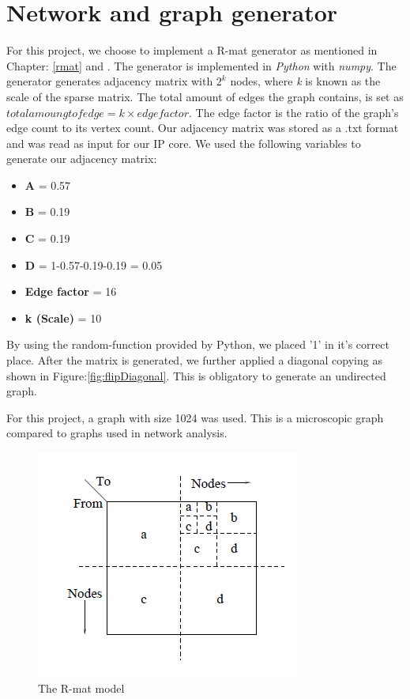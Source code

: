 \section{Network and graph generator}
For this project, we choose to implement a R-mat generator as mentioned in Chapter: \ref{rmat} and  \cite{Rmat2004}. The generator is implemented in \textit{Python} \cite{PYTHON} with \textit{numpy}. The generator generates adjacency matrix with $2^k$ nodes, where \textit{k} is known as the scale of the sparse matrix. The total amount of edges the graph contains, is set as $total amoungt of edge = k \times edge factor $. The edge factor is the ratio of the graph's edge count to its vertex count\cite{graph500}. Our adjacency matrix was stored as a .txt format and was read as input for our IP core. 
We used the following variables to generate our adjacency matrix:
\begin{itemize}
\item \textbf{A} = 0.57
\item \textbf{B} = 0.19
\item \textbf{C} = 0.19
\item \textbf{D} = 1-0.57-0.19-0.19 = 0.05
\item \textbf{Edge factor}  = 16
\item \textbf{k (Scale)} =  10
\end{itemize}

By using the random-function provided by Python, we placed '1' in it's correct place. After the matrix is generated, we further applied a diagonal copying as shown in Figure:\ref{fig:flipDiagonal}. This is obligatory to generate an undirected graph.

For this project, a graph with size 1024 was used. This is a microscopic graph compared to graphs used in network analysis. 

\begin{figure}
\includegraphics{Figures/Rmat}
\caption{The R-mat model \cite{Rmat2004}}
\label{fig:Rmat}
\end{figure}



